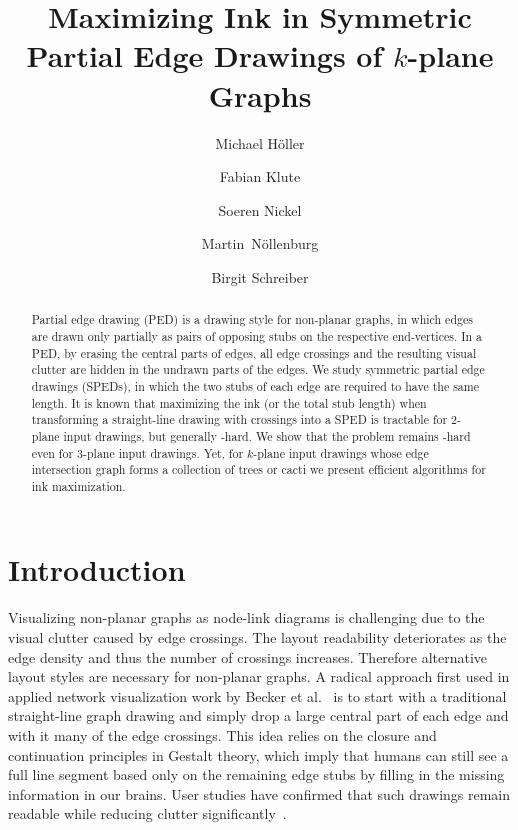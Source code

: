 \documentclass[a4paper,english,numberwithinsect]{eurocg18}
\title{Maximizing Ink in Symmetric Partial Edge Drawings of $k$-plane Graphs}
\author[1]{Michael H\"oller}
\author[1]{Fabian Klute}
\author[1]{Soeren Nickel}
\author[1]{Martin~N\"ollenburg}
\author[1]{Birgit Schreiber}
\affil[1]{Algorithms and Complexity Group, TU Wien, Vienna, Austria\\ \texttt{[fklute|noellenburg]@ac.tuwien.ac.at}}
\begin{document}
\maketitle

\begin{abstract}
	Partial edge drawing (PED) is a drawing style for non-planar graphs, in which edges are drawn only partially as pairs of opposing stubs on the respective end-vertices. 
	In a PED, by erasing the central parts of edges, all edge crossings and the resulting visual clutter are hidden in the undrawn parts of the edges.
	We study symmetric partial edge drawings (SPEDs), in which the two stubs of each edge are required to have the same length. 
	It is known that maximizing the ink (or the total stub length) when transforming a straight-line drawing with crossings into a SPED is tractable for 2-plane input drawings, but generally \NP-hard.
	We show that the problem remains \NP-hard even for 3-plane input drawings.
	Yet, for $k$-plane input drawings whose edge intersection graph forms a collection of trees or cacti we present efficient algorithms for ink maximization.
\end{abstract}

\section{Introduction}

Visualizing non-planar graphs as node-link diagrams is challenging due to the visual clutter caused by edge crossings. The layout readability deteriorates as the edge density and thus the number of crossings increases.
Therefore alternative layout styles are necessary for non-planar graphs.
A radical approach first used in applied network visualization work by Becker et al.~\cite{bew-vnd-95} is to start with a traditional straight-line graph drawing and simply drop a large central part of each edge and with it many of the edge crossings.
This idea relies on the closure and continuation principles in Gestalt theory, which imply that humans can still see a full line segment based only on the remaining edge stubs by filling in the missing information in our brains.
User studies have confirmed that such drawings remain readable while reducing clutter significantly~\cite{bvkw-epdldge-12,bkl-us-15}.
\end{document}

